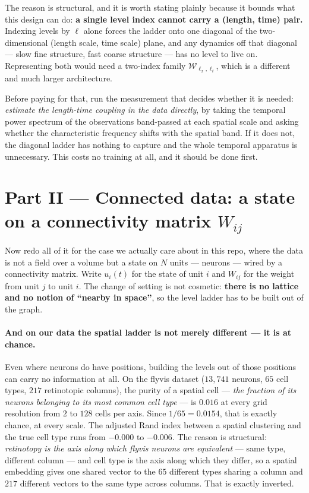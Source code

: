 \documentclass[11pt,a4paper]{article}
\newcommand{\Ws}{\mathcal{W}}
\begin{document}
The reason is structural, and it is worth stating plainly because it bounds what this design
can do: \textbf{a single level index cannot carry a (length, time) pair.} Indexing levels by
$\ell$ alone forces the ladder onto one diagonal of the two-dimensional (length scale, time
scale) plane, and any dynamics off that diagonal --- slow fine structure, fast coarse
structure --- has no level to live on. Representing both would need a two-index family
$\Ws_{\ell_x,\ell_t}$, which is a different and much larger architecture.

Before paying for that, run the measurement that decides whether it is needed: \emph{estimate
the length-time coupling in the data directly}, by taking the temporal power spectrum of the
observations band-passed at each spatial scale and asking whether the characteristic
frequency shifts with the spatial band. If it does not, the diagonal ladder has nothing to
capture and the whole temporal apparatus is unnecessary. This costs no training at all, and
it should be done first.

\section{Part II --- Connected data: a state on a connectivity matrix $W_{ij}$}
\label{sec:graph}

Now redo all of it for the case we actually care about in this repo, where the data is not
a field over a volume but a state on $N$ units --- neurons --- wired by a connectivity
matrix. Write $u_i(t)$ for the state of unit $i$ and $W_{ij}$ for the weight from unit $j$
to unit $i$. The change of setting is not cosmetic: \textbf{there is no lattice and no
notion of ``nearby in space''}, so the level ladder has to be built out of the graph.

\paragraph{And on our data the spatial ladder is not merely different --- it is at chance.}
Even where neurons do have positions, building the levels out of those positions can carry
no information at all. On the flyvis dataset ($13{,}741$ neurons, $65$ cell types, $217$
retinotopic columns), the purity of a spatial cell --- \emph{the fraction of its neurons
belonging to its most common cell type} --- is $0.016$ at every grid resolution from $2$ to
$128$ cells per axis. Since $1/65 = 0.0154$, that is exactly chance, at every scale. The
adjusted Rand index between a spatial clustering and the true cell type runs from $-0.000$
to $-0.006$. The reason is structural: \emph{retinotopy is the axis along which flyvis
neurons are equivalent} --- same type, different column --- and cell type is the axis along
which they differ, so a spatial embedding gives one shared vector to the $65$ different
types sharing a column and $217$ different vectors to the same type across columns. That is
exactly inverted.
\end{document}
